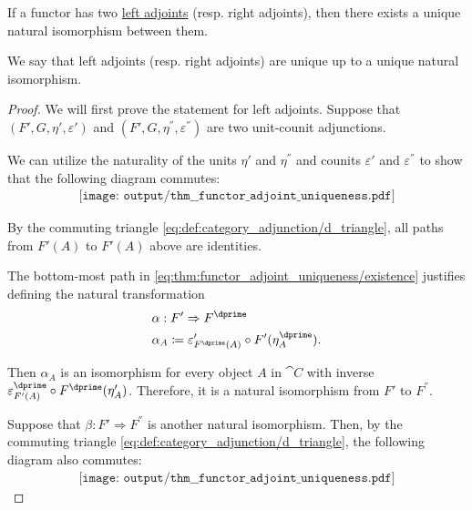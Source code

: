 \begin{proposition}\label{thm:functor_adjoint_uniqueness}
  If a functor has two \hyperref[def:category_adjunction]{left adjoints} (resp. right adjoints), then there exists a unique natural isomorphism between them.

  We say that left adjoints (resp. right adjoints) are unique up to a unique natural isomorphism.
\end{proposition}
\begin{proof}
  We will first prove the statement for left adjoints. Suppose that \( (F', G, \eta', \varepsilon') \) and \( (F', G, \eta^\dprime, \varepsilon^\dprime) \) are two unit-counit adjunctions.

   We can utilize the naturality of the units \( \eta' \) and \( \eta^\dprime \) and counits \( \varepsilon' \) and \( \varepsilon^\dprime \) to show that the following diagram commutes:
  \begin{equation}\label{eq:thm:functor_adjoint_uniqueness/existence}
    \begin{aligned}
      \texttt{[image: output/thm\_\_functor\_adjoint\_uniqueness.pdf]}
    \end{aligned}
  \end{equation}

  By the commuting triangle \eqref{eq:def:category_adjunction/d_triangle}, all paths from \( F'(A) \) to \( F'(A) \) above are identities.

  The bottom-most path in \eqref{eq:thm:functor_adjoint_uniqueness/existence} justifies defining the natural transformation
  \begin{equation*}
    \begin{aligned}
      &\alpha: F' \Rightarrow F^\dprime \\
      &\alpha_A \coloneqq \varepsilon'_{F^\dprime(A)} \bincirc F'(\eta_A^\dprime).
    \end{aligned}
  \end{equation*}

  Then \( \alpha_A \) is an isomorphism for every object \( A \) in \( \cat{C} \) with inverse \( \varepsilon_{F'(A)}^\dprime \bincirc F^\dprime(\eta_A') \). Therefore, it is a natural isomorphism from \( F' \) to \( F^\dprime \).

   Suppose that \( \beta: F' \Rightarrow F^\dprime \) is another natural isomorphism. Then, by the commuting triangle \eqref{eq:def:category_adjunction/d_triangle}, the following diagram also commutes:
  \begin{equation}\label{eq:thm:functor_adjoint_uniqueness/uniqueness}
    \begin{aligned}
      \texttt{[image: output/thm\_\_functor\_adjoint\_uniqueness.pdf]}
    \end{aligned}
  \end{equation}


\end{proof}
